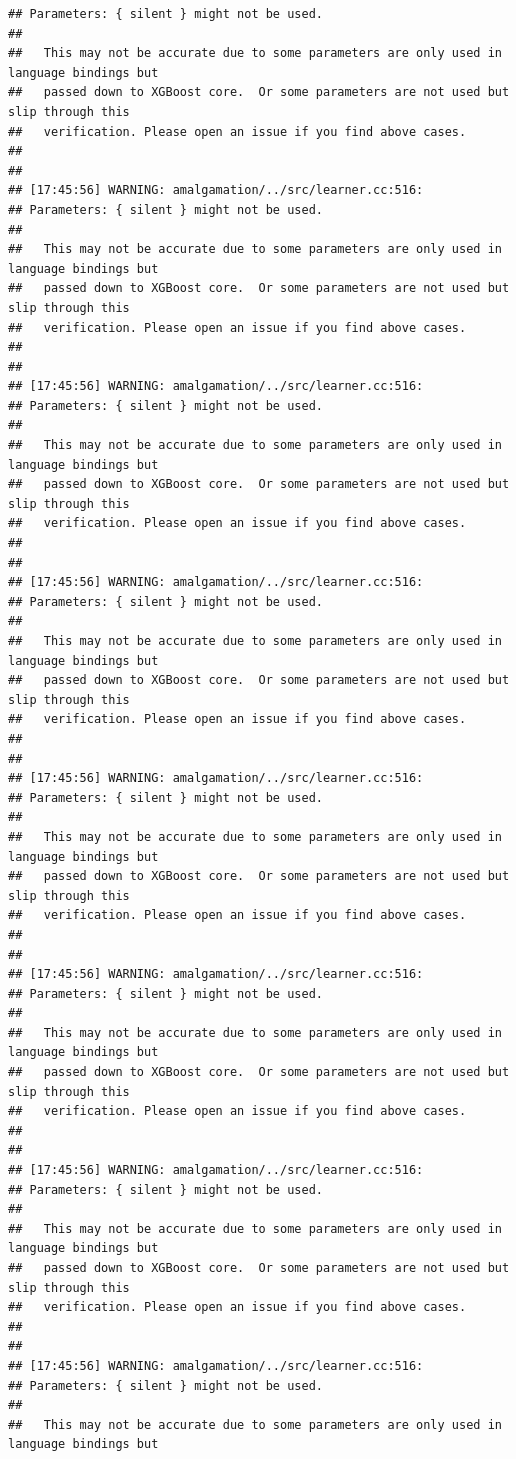 \documentclass[AMS,STIX2COL]{WileyNJD-v2}\usepackage[]{graphicx}\usepackage[]{color}
\makeatletter
\newenvironment{kframe}{%
 \def\at@end@of@kframe{}%
 \ifinner\ifhmode%
  \def\at@end@of@kframe{\end{minipage}}%
  \begin{minipage}{\columnwidth}%
 \fi\fi%
 \def\FrameCommand##1{\hskip\@totalleftmargin \hskip-\fboxsep
 \colorbox{shadecolor}{##1}\hskip-\fboxsep
     \hskip-\linewidth \hskip-\@totalleftmargin \hskip\columnwidth}%
 \MakeFramed {\advance\hsize-\width
   \@totalleftmargin\z@ \linewidth\hsize
   \@setminipage}}%
 {\par\unskip\endMakeFramed%
 \at@end@of@kframe}
\newenvironment{knitrout}{}{} %
\makeatother
\begin{document}
\begin{knitrout}
\begin{kframe}
\begin{verbatim}
## Parameters: { silent } might not be used.
## 
##   This may not be accurate due to some parameters are only used in language bindings but
##   passed down to XGBoost core.  Or some parameters are not used but slip through this
##   verification. Please open an issue if you find above cases.
## 
## 
## [17:45:56] WARNING: amalgamation/../src/learner.cc:516: 
## Parameters: { silent } might not be used.
## 
##   This may not be accurate due to some parameters are only used in language bindings but
##   passed down to XGBoost core.  Or some parameters are not used but slip through this
##   verification. Please open an issue if you find above cases.
## 
## 
## [17:45:56] WARNING: amalgamation/../src/learner.cc:516: 
## Parameters: { silent } might not be used.
## 
##   This may not be accurate due to some parameters are only used in language bindings but
##   passed down to XGBoost core.  Or some parameters are not used but slip through this
##   verification. Please open an issue if you find above cases.
## 
## 
## [17:45:56] WARNING: amalgamation/../src/learner.cc:516: 
## Parameters: { silent } might not be used.
## 
##   This may not be accurate due to some parameters are only used in language bindings but
##   passed down to XGBoost core.  Or some parameters are not used but slip through this
##   verification. Please open an issue if you find above cases.
## 
## 
## [17:45:56] WARNING: amalgamation/../src/learner.cc:516: 
## Parameters: { silent } might not be used.
## 
##   This may not be accurate due to some parameters are only used in language bindings but
##   passed down to XGBoost core.  Or some parameters are not used but slip through this
##   verification. Please open an issue if you find above cases.
## 
## 
## [17:45:56] WARNING: amalgamation/../src/learner.cc:516: 
## Parameters: { silent } might not be used.
## 
##   This may not be accurate due to some parameters are only used in language bindings but
##   passed down to XGBoost core.  Or some parameters are not used but slip through this
##   verification. Please open an issue if you find above cases.
## 
## 
## [17:45:56] WARNING: amalgamation/../src/learner.cc:516: 
## Parameters: { silent } might not be used.
## 
##   This may not be accurate due to some parameters are only used in language bindings but
##   passed down to XGBoost core.  Or some parameters are not used but slip through this
##   verification. Please open an issue if you find above cases.
## 
## 
## [17:45:56] WARNING: amalgamation/../src/learner.cc:516: 
## Parameters: { silent } might not be used.
## 
##   This may not be accurate due to some parameters are only used in language bindings but

\end{verbatim}
\end{kframe}
\end{knitrout}
\end{document}
